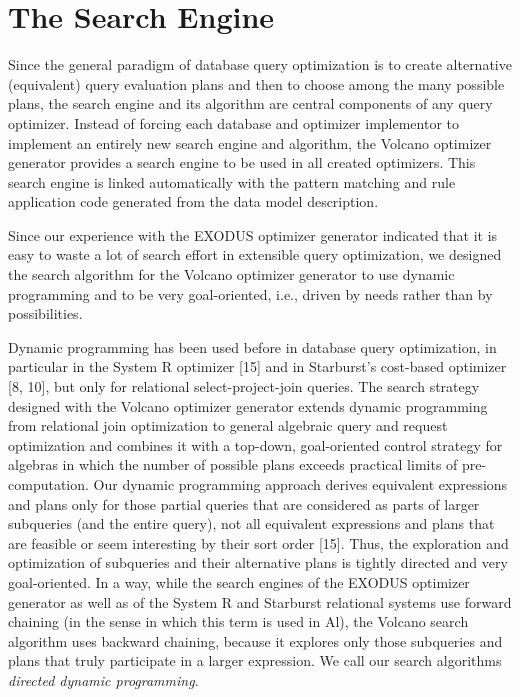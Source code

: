 \documentclass[a4paper,12pt,notitlepage,twoside,openright]{article}
\begin{document}
\hypertarget{the-search-engine}{%
\section{The Search Engine}\label{the-search-engine}}

Since the general paradigm of database query optimization is to create
alternative (equivalent) query evaluation plans and then to choose among
the many possible plans, the search engine and its algorithm are central
components of any query optimizer. Instead of forcing each database and
optimizer implementor to implement an entirely new search engine and
algorithm, the Volcano optimizer generator provides a search engine to
be used in all created optimizers. This search engine is linked
automatically with the pattern matching and rule application code
generated from the data model description.

Since our experience with the EXODUS optimizer generator indicated that
it is easy to waste a lot of search effort in extensible query
optimization, we designed the search algorithm for the Volcano optimizer
generator to use dynamic programming and to be very goal-oriented, i.e.,
driven by needs rather than by possibilities.

Dynamic programming has been used
before in database query optimization, in particular in the System R
optimizer {[}15{]} and in Starburst's cost-based optimizer {[}8, 10{]},
but only for relational select-project-join queries. The search strategy
designed with the Volcano optimizer generator extends dynamic
programming from relational join optimization to general algebraic query
and request optimization and combines it with a top-down, goal-oriented
control strategy for algebras in which the number of possible plans
exceeds practical limits of pre-computation. Our dynamic programming
approach derives equivalent expressions and plans only for those partial
queries that are considered as parts of larger subqueries (and the
entire query), not all equivalent expressions and plans that are
feasible or seem interesting by their sort order {[}15{]}. Thus, the
exploration and optimization of subqueries and their alternative plans
is tightly directed and very goal-oriented. In a way, while the search
engines of the EXODUS optimizer generator as well as of the System R and
Starburst relational systems use forward chaining (in the sense in which
this term is used in Al), the Volcano search algorithm uses backward
chaining, because it explores only those subqueries and plans that truly
participate in a larger expression. We call our search algorithms
\emph{directed dynamic programming}.
\end{document}
